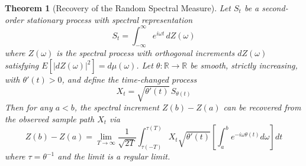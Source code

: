 \documentclass{article}
\newtheorem{theorem}{Theorem}
\begin{document}
\begin{theorem}
  [Recovery of the Random Spectral Measure] Let $S_t$ be a second-order
  stationary process with spectral representation
  \begin{equation}
    S_t = \int_{- \infty}^{\infty} e^{i \omega t} \, dZ (\omega)
  \end{equation}
  where $Z (\omega)$ is the spectral process with orthogonal increments $dZ
  (\omega)$ satisfying $E [|dZ (\omega)|^2] = d\mu (\omega)$. Let $\theta :
  \mathbb{R} \to \mathbb{R}$ be smooth, strictly increasing, with $\theta'(t) > 0$, and define the time-changed process
  \begin{equation}
    X_t = \sqrt{\theta'(t)}\, S_{\theta(t)}
  \end{equation}
  Then for any $a < b$, the spectral increment $Z(b) - Z(a)$ can be recovered from the observed sample path $X_t$ via
  \begin{equation}
    Z(b) - Z(a) = \lim_{T \to \infty} \frac{1}{\sqrt{2T}} \int_{\tau(-T)}^{\tau(T)} X_t \sqrt{\theta'(t)} \left[ \int_a^b e^{-i\omega\theta(t)} d\omega \right] dt
  \end{equation}
  where $\tau = \theta^{-1}$ and the limit is a regular limit.
\end{theorem}
\end{document}
